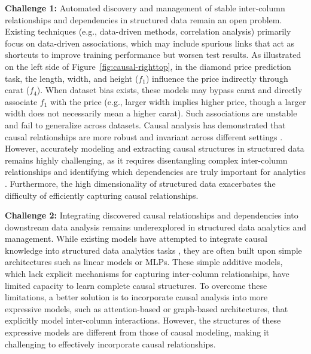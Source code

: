 \documentclass[sigconf, nonacm]{acmart}
\newcommand{\icde}[1]{{\color{black}#1}}
\newcommand{\done}[1]{{\color{black}#1}}
\newcommand{\rem}[1]{{\color{black}#1}}
\newcommand{\vldb}[1]{{\color{red}#1}}
\begin{document}
\textbf{Challenge 1:} 
\vldb{Automated discovery and management of stable inter-column relationships and dependencies in structured data remain an open problem. 
Existing techniques (e.g., data-driven methods, %
correlation analysis) primarily focus on data-driven associations, 
}
which may include spurious links that act as shortcuts to improve training performance but worsen test results. 
As illustrated on the left side of Figure~\ref{fig:causal-righttop}, in the diamond price prediction task, \rem{the length, width, and height ($f_1$)} influence the price indirectly through carat ($f_4$). When dataset bias exists, these models may bypass carat and directly associate $f_1$ with the price (e.g., \rem{larger width implies higher price, though a larger width does not necessarily mean a higher carat).} 
Such associations are unstable and fail to generalize across datasets. Causal analysis has demonstrated that causal relationships are more robust and invariant across different settings \cite{r:causalgood}.
However, accurately modeling and extracting causal structures in structured data remains highly challenging, as it requires disentangling complex inter-column relationships and identifying which dependencies are truly important for \vldb{analytics \cite{notears, r:suna}.} \done{Furthermore, the high dimensionality of structured data exacerbates the difficulty of efficiently capturing causal relationships.
}

\textbf{Challenge 2:} 
\vldb{Integrating discovered causal relationships and dependencies into %
downstream data analysis
remains underexplored 
in structured data analytics and management.
While existing models have attempted to integrate causal knowledge into structured data \vldb{analytics} tasks} \cite{r:CASTLE, r:linear}, they are often built upon simple architectures such as linear models or MLPs. 
These simple additive models, which lack explicit mechanisms for capturing inter-column relationships, have limited capacity to learn complete causal structures\cite{r:MLP}.
To overcome these limitations, a better solution is to incorporate causal analysis into more expressive models, such as attention-based or graph-based architectures, that explicitly model inter-column interactions.
However, \icde{
the structures of these expressive models are different from those of causal modeling, making it challenging to effectively incorporate causal relationships.
}
\end{document}

